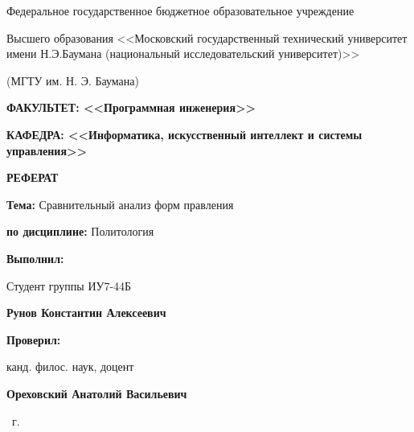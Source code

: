 \begin{titlepage}
    \begin{center}
        {
            Федеральное государственное бюджетное образовательное учреждение

            Высшего образования <<Московский государственный технический университет имени Н.Э.Баумана (национальный исследовательский университет)>>

            (МГТУ им. Н. Э. Баумана)
        }

        \vspace{3cm}

        \begin{flushleft}
            \textbf{ФАКУЛЬТЕТ: <<Программная инженерия>>}

            \textbf{КАФЕДРА: <<Информатика, искусственный интеллект и системы управления>>}
        \end{flushleft}

        \vspace{2cm}

        {
            \Huge{\textbf{РЕФЕРАТ}}
        }

        \vspace{0.5cm}

        \textbf{Тема:} Сравнительный анализ форм правления

        \textbf{по дисциплине:} Политология

        \vfill

        \begin{flushright}
            \textbf{Выполнил:}

            Студент группы ИУ7-44Б

            \textbf{Рунов Константин Алексеевич}

            \textbf{Проверил:}

            канд. филос. наук, доцент

            \textbf{Ореховский Анатолий Васильевич}
        \end{flushright}

        \the\year\ г.

    \end{center}
\end{titlepage}
